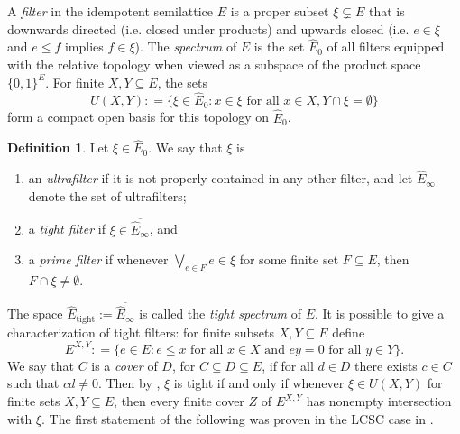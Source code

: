 \documentclass[12pt]{amsart}
\theoremstyle{definition}
\newtheorem{definition}[thm]{Definition}
\theoremstyle{remark}
\numberwithin{equation}{section}
\newcommand{\Ef}{\widehat E_0}
\newcommand{\Eu}{\widehat E_\infty}
\newcommand{\Et}{\widehat E_{\text{tight}}}
\begin{document}
	
	
	A {\em filter} in the idempotent semilattice $E$ is a proper subset $\xi\subsetneq E$ that is downwards directed (i.e. closed under products) and upwards closed (i.e. $e\in\xi$ and $e\leqslant f$ implies $f\in \xi$). The {\em spectrum} of $E$ is the set $\Ef$ of all filters equipped with the relative topology when viewed as a subspace of the product space $\{0,1\}^E$. For finite $X,Y\subseteq E$, the sets
	\[
	U(X,Y) : = \{\xi\in\Ef: x\in \xi\text{ for all }x\in X, Y\cap \xi =\emptyset\}
	\]
	form a compact open basis for this topology on $\Ef$.
	
	\begin{definition}
		Let $\xi\in \Ef$. We say that $\xi$ is
		\begin{enumerate}
			\item an {\em ultrafilter} if it is not properly contained in any other filter, and let $\Eu$ denote the set of ultrafilters;
			\item a {\em tight filter} if $\xi\in \overline{\Eu}$, and
			\item a {\em prime filter} if whenever $\bigvee_{e\in F}e\in \xi$ for some finite set $F\subseteq E$, then $F\cap \xi\neq \emptyset$. 
		\end{enumerate}
	\end{definition} The space $\Et :=\overline{\Eu}$ is called the {\em tight spectrum} of $E$. It is possible to give a characterization of tight filters: for finite subsets $X,Y\subseteq E$ define
	\[
	E^{X,Y}: = \{e\in E: e\leqslant x\text{ for all }x\in X\text{ and }ey = 0\text{ for all }y\in Y\}.
	\]
	We say that $C$ is a {\em cover} of $D$, for $C\subseteq D\subseteq E$, if for all $d\in D$ there exists $c\in C$ such that $cd\neq 0$. Then by \cite[Theorem~12.9]{Ex08}, $\xi$ is tight if and only if whenever $\xi\in U(X, Y)$ for finite sets $X,Y\subseteq E$, then every finite cover $Z$ of $E^{X,Y}$ has nonempty intersection with $\xi$. 
	The first statement of the following was proven in the LCSC case in \cite[Lemma~3.10]{OP20}. 
	
\end{document}
